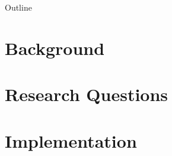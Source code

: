\documentclass[aspectratio=43,10pt]{beamer}
\begin{document}
\begin{frame}{Outline}
  \tableofcontents[hideallsubsections]
\end{frame}

\section[Background]{Background}


\section[Questions]{Research Questions}


\section[Implementation]{Implementation}

\end{document}
